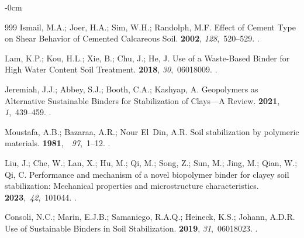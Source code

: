\documentclass[sustainability,article,accept,pdftex,moreauthors]{Definitions/mdpi}
\begin{document}
{{\begin{adjustwidth}{-\extralength}{0cm}
\begin{thebibliography}{999}
Ismail, M.A.; Joer, H.A.; Sim, W.H.; Randolph, M.F.
\newblock Effect of Cement Type on Shear Behavior of Cemented Calcareous Soil.\linebreak 
{} {\bf
  2002}, {\em 128},~520--529.
.

Lam, K.P.; Kou, H.L.; Xie, B.; Chu, J.; He, J.
\newblock Use of a Waste-Based Binder for High Water Content Soil Treatment.
 {\bf 2018}, {\em
  30},~06018009.
.

Jeremiah, J.J.; Abbey, S.J.; Booth, C.A.; Kashyap, A.
\newblock Geopolymers as Alternative Sustainable Binders for Stabilization of
  Clays---\linebreak A Review.
 {\bf 2021}, {\em 1},~439--459.
.

Moustafa, A.B.; Bazaraa, A.R.; Nour El~Din, A.R.
\newblock Soil stabilization by polymeric materials.
 \mbox{{\bf 1981}, {\em
  97},~1--12.}
.

Liu, J.; Che, W.; Lan, X.; Hu, M.; Qi, M.; Song, Z.; Sun, M.; Jing, M.; Qian,
  W.; Qi, C.
\newblock Performance and mechanism of a novel biopolymer binder for clayey
  soil stabilization: Mechanical properties and microstructure characteristics.
 \mbox{{\bf 2023}, {\em 42},~101044.}
.

Consoli, N.C.; Marin, E.J.B.; Samaniego, R.A.Q.; Heineck, K.S.; Johann, A.D.R.
\newblock Use of Sustainable Binders in Soil Stabilization.\linebreak 
{} {\bf 2019}, {\em
  31},~06018023.
.


\end{thebibliography}
\end{adjustwidth}}}
\end{document}
